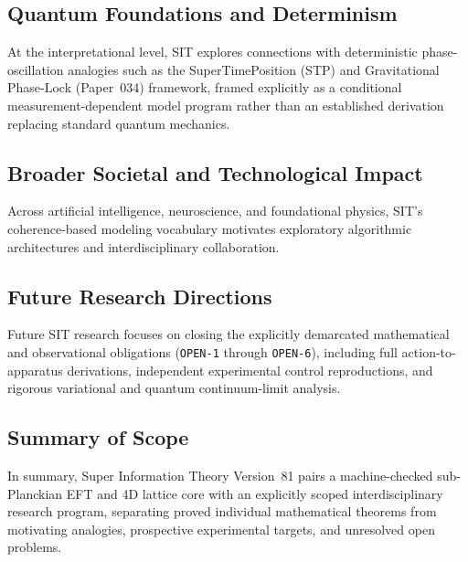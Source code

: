 \subsection{Quantum Foundations and Determinism}

At the interpretational level, SIT explores connections with deterministic phase-oscillation analogies such as the SuperTimePosition (STP) and Gravitational Phase-Lock (Paper~034) framework, framed explicitly as a conditional measurement-dependent model program rather than an established derivation replacing standard quantum mechanics.

\subsection{Broader Societal and Technological Impact}

Across artificial intelligence, neuroscience, and foundational physics, SIT's coherence-based modeling vocabulary motivates exploratory algorithmic architectures and interdisciplinary collaboration.

\subsection{Future Research Directions}

Future SIT research focuses on closing the explicitly demarcated mathematical and observational obligations (\texttt{OPEN-1} through \texttt{OPEN-6}), including full action-to-apparatus derivations, independent experimental control reproductions, and rigorous variational and quantum continuum-limit analysis.

\subsection{Summary of Scope}

In summary, Super Information Theory Version~81 pairs a machine-checked sub-Planckian EFT and 4D lattice core with an explicitly scoped interdisciplinary research program, separating proved individual mathematical theorems from motivating analogies, prospective experimental targets, and unresolved open problems.

